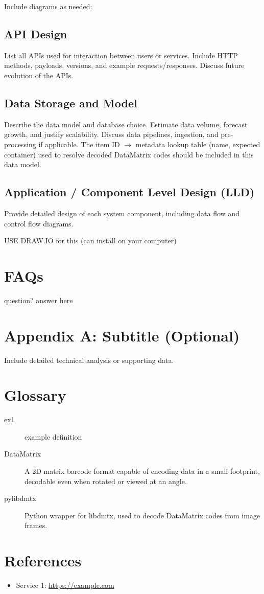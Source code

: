 \documentclass[12pt,a4paper]{article}
\begin{document}
Include diagrams as needed:
\begin{center}
\end{center}
 
\subsection{API Design}
List all APIs used for interaction between users or services.
Include HTTP methods, payloads, versions, and example requests/responses.
Discuss future evolution of the APIs.
 
\subsection{Data Storage and Model}
Describe the data model and database choice.
Estimate data volume, forecast growth, and justify scalability.
Discuss data pipelines, ingestion, and pre-processing if applicable. The item ID $\rightarrow$ metadata lookup table (name, expected container) used to resolve decoded DataMatrix codes should be included in this data model.
 
\subsection{Application / Component Level Design (LLD)}
Provide detailed design of each system component, including data flow and control flow diagrams.
 
USE DRAW.IO for this (can install on your computer)
 
\newpage
\section{FAQs}
 
question?
answer here
 
\newpage
\appendix
\section{Appendix A: Subtitle (Optional)}
Include detailed technical analysis or supporting data.
 
\newpage
\section{Glossary}
\begin{description}
  \item[ex1] example definition
  \item[DataMatrix] A 2D matrix barcode format capable of encoding data in a small footprint, decodable even when rotated or viewed at an angle.
  \item[pylibdmtx] Python wrapper for libdmtx, used to decode DataMatrix codes from image frames.
\end{description}
 
\newpage
\section{References}
\begin{itemize}
  \item Service 1: \url{https://example.com}
\end{itemize}
 
\end{document}
